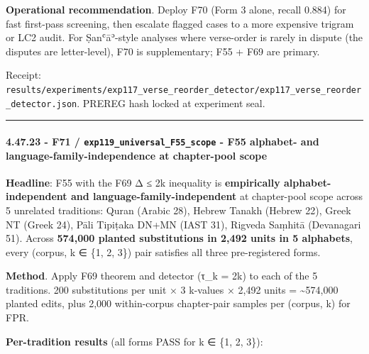 \documentclass[
]{article}
\begin{document}
\textbf{Operational recommendation}. Deploy F70 (Form 3 alone, recall
0.884) for fast first-pass screening, then escalate flagged cases to a
more expensive trigram or LC2 audit. For Ṣanʿāʾ-style analyses where
verse-order is rarely in dispute (the disputes are letter-level), F70 is
supplementary; F55 + F69 are primary.

Receipt:
\texttt{results/experiments/exp117\_verse\_reorder\_detector/exp117\_verse\_reorder\_detector.json}.
PREREG hash locked at experiment seal.

\begin{center}\rule{0.5\linewidth}{0.5pt}\end{center}

\paragraph{\texorpdfstring{4.47.23 - F71 /
\texttt{exp119\_universal\_F55\_scope} - F55 alphabet- and
language-family-independence at chapter-pool
scope}{4.47.23 - F71 / exp119\_universal\_F55\_scope - F55 alphabet- and language-family-independence at chapter-pool scope}}\label{f71-exp119_universal_f55_scope---f55-alphabet--and-language-family-independence-at-chapter-pool-scope}

\textbf{Headline}: F55 with the F69 Δ ≤ 2k inequality is
\textbf{empirically alphabet-independent and
language-family-independent} at chapter-pool scope across 5 unrelated
traditions: Quran (Arabic 28), Hebrew Tanakh (Hebrew 22), Greek NT
(Greek 24), Pāli Tipiṭaka DN+MN (IAST 31), Rigveda Saṃhitā (Devanagari
51). Across \textbf{574,000 planted substitutions in 2,492 units in 5
alphabets}, every (corpus, k ∈ \{1, 2, 3\}) pair satisfies all three
pre-registered forms.

\textbf{Method}. Apply F69 theorem and detector (τ\_k = 2k) to each of
the 5 traditions. 200 substitutions per unit × 3 k-values × 2,492 units
= \textasciitilde574,000 planted edits, plus 2,000 within-corpus
chapter-pair samples per (corpus, k) for FPR.

\textbf{Per-tradition results} (all forms PASS for k ∈ \{1, 2, 3\}):
\end{document}
